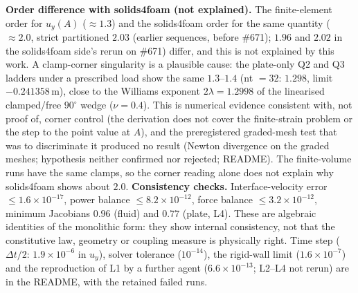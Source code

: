 \documentclass[sn-mathphys,Numbered]{sn-jnl}
\newcommand{\legbc}{\textcolor{red!70!black}{(earlier sequences, before \#671)}}
\begin{document}
\textbf{Order difference with solids4foam (not explained).} The finite-element order for $u_y(A)$ ($\approx1.3$) and the solids4foam order for the same quantity ($\approx2.0$, strict partitioned $2.03$ \legbc; $1.96$ and $2.02$ in the solids4foam side's rerun on \#671) differ, and this is not explained by this work. A clamp-corner singularity is a plausible cause: the plate-only Q2 and Q3 ladders under a prescribed load show the same $1.3$--$1.4$ (nt $=32$: $1.298$, limit $-0.241358\,\mathrm m$), close to the Williams exponent $2\lambda=1.2998$ of the linearised clamped/free $90^\circ$ wedge ($\nu=0.4$). This is numerical evidence consistent with, not proof of, corner control (the derivation does not cover the finite-strain problem or the step to the point value at $A$), and the preregistered graded-mesh test that was to discriminate it produced no result (Newton divergence on the graded meshes; hypothesis neither confirmed nor rejected; README). The finite-volume runs have the same clamps, so the corner reading alone does not explain why solids4foam shows about $2.0$.
\textbf{Consistency checks.} Interface-velocity error $\le1.6\times10^{-17}$, power balance $\le8.2\times10^{-12}$, force balance $\le3.2\times10^{-12}$, minimum Jacobians $0.96$ (fluid) and $0.77$ (plate, L4). These are algebraic identities of the monolithic form: they show internal consistency, not that the constitutive law, geometry or coupling measure is physically right. Time step ($\Delta t/2$: $1.9\times10^{-6}$ in $u_y$), solver tolerance ($10^{-14}$), the rigid-wall limit ($1.6\times10^{-7}$) and the reproduction of L1 by a further agent ($6.6\times10^{-13}$; L2--L4 not rerun) are in the README, with the retained failed runs.
\end{document}
